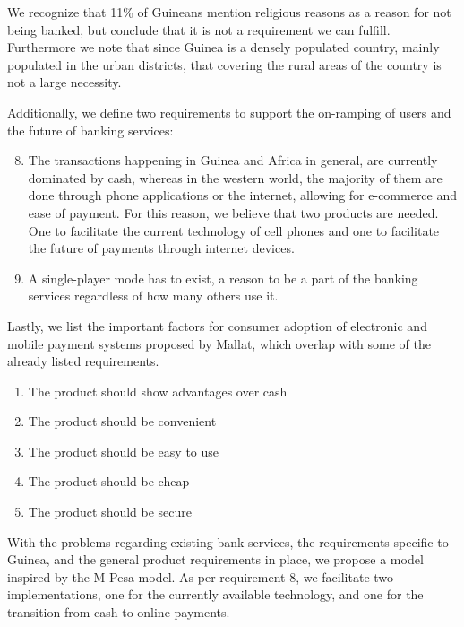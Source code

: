 \documentclass[11pt, a4paper]{article}
\begin{document}
We recognize that 11\% of Guineans mention religious reasons as a reason for not being banked, but conclude that it is not a requirement we can fulfill. Furthermore we note that since Guinea is a densely populated country, mainly populated in the urban districts, that covering the rural areas of the country is not a large necessity.

Additionally, we define two requirements to support the on-ramping of users and the future of banking services:

\begin{enumerate}
  \setcounter{enumi}{7}
  \item The transactions happening in Guinea and Africa in general, are currently dominated by cash, whereas in the western world, the majority of them are done through phone applications or the internet, allowing for e-commerce and ease of payment. For this reason, we believe that two products are needed. One to facilitate the current technology of cell phones and one to facilitate the future of payments through internet devices.
  \item A single-player mode has to exist, a reason to be a part of the banking services regardless of how many others use it.
\end{enumerate}

Lastly, we list the important factors for consumer adoption of electronic and mobile payment systems proposed by Mallat\cite{Mallat}, which overlap with some of the already listed requirements.
\begin{enumerate}
  \item The product should show advantages over cash
  \item The product should be convenient
  \item The product should be easy to use
  \item The product should be cheap
  \item The product should be secure
\end{enumerate}

With the problems regarding existing bank services, the requirements specific to Guinea, and the general product requirements in place, we propose a model inspired by the M-Pesa model. As per requirement 8, we facilitate two implementations, one for the currently available technology, and one for the transition from cash to online payments.
\end{document}
